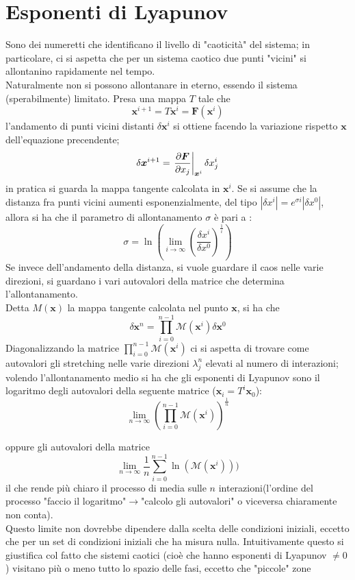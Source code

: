 \documentclass[a4paper,12pt]{article}
\theoremstyle{plain}
\renewcommand{\vec}[1]{{\boldsymbol{#1}}}
\theoremstyle{definition}
\newcommand{\Op}[1]{\mathcal{#1}}
\newcommand{\f}[2]{\frac{#1}{#2}}
\newcommand{\pos}{\vec{x}}
\newcommand{\ra}{\rightarrow}
\theoremstyle{remark}
\begin{document}
\section{Esponenti di Lyapunov}
Sono dei numeretti che identificano il livello di "caoticità" del sistema; in particolare, ci si aspetta che per un sistema caotico due punti "vicini" si allontanino rapidamente nel tempo.
\\Naturalmente non si possono allontanare in eterno, essendo il sistema (sperabilmente) limitato.
Presa una mappa $T$ tale che 
\[\pos^{i+1}=T\pos^i=\vec{F}(\pos^i)\]
l'andamento di punti vicini distanti $\delta \pos^i$ si ottiene facendo la variazione rispetto $\pos$ dell'equazione precendente;
\[\delta\pos^{i+1}=\left.\pdv{\vec{F}}{x_j}\right|_{\vec{x}^i}{\delta x^i_j}	\]
in pratica si guarda la mappa tangente calcolata in $\pos^i$. Se si assume che la distanza fra punti vicini aumenti esponenzialmente, del tipo $|\delta x^i|=e^{\sigma i}  |\delta x^0|$, allora si ha che il parametro di allontanamento $\sigma$ è pari a :
\[\sigma=\ln\left(\lim_{i\rightarrow\infty}  \left(\f{\delta x^i}{\delta x^0}\right)^{\f{1}{i}}\right)	\]
Se invece dell'andamento della distanza, si vuole guardare il caos nelle varie direzioni, si guardano i vari autovalori della matrice che determina l'allontanamento.
\\Detta $M(\pos)$ la mappa tangente calcolata nel punto $\pos$, si ha che \[\delta \pos^n=\prod_{i=0}^{n-1} \Op{M}(\pos^i)  \delta \pos^0\]
Diagonalizzando la matrice $\prod_{i=0}^{n-1} \Op{M}(\pos^i) $ ci si aspetta di trovare come autovalori gli stretching nelle varie direzioni $\lambda_j^n$ elevati al numero di interazioni; volendo l'allontanamento medio si ha che gli esponenti di Lyapunov sono il logaritmo degli autovalori della seguente matrice ($\pos_i=T^i \pos_0$):
\[\lim_{n\rightarrow \infty}	\left(\prod_{i=0}^{n-1} \Op{M}(\pos^i) 	\right)^{\f{1}{n}}	\]

oppure gli autovalori della matrice
\[\lim_{n\rightarrow\infty}\f{1}{n}\sum_{i=0}^{n-1}\ln\left( \Op{M}(\pos^i) 	\right))	\]
il che rende più chiaro il processo di media sulle $n$ interazioni(l'ordine del processo "faccio il logaritmo"$\ra$"calcolo gli autovalori" o viceversa chiaramente non conta).
\\ Questo limite non dovrebbe dipendere dalla scelta delle condizioni iniziali, eccetto che per un set di condizioni iniziali che ha misura nulla.
Intuitivamente questo si giustifica col fatto che sistemi caotici (cioè che hanno esponenti di Lyapunov $\ne 0$) visitano più o meno tutto lo spazio delle fasi, eccetto che "piccole" zone
\end{document}
